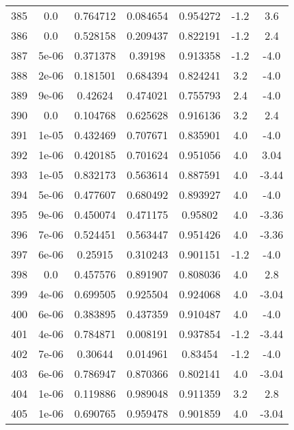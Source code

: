 \begin{table}
\begin{tabular}{c|c|c|c|c|c|c}
385 & 0.0 & 0.764712 & 0.084654 & 0.954272 & -1.2 & 3.6\\
386 & 0.0 & 0.528158 & 0.209437 & 0.822191 & -1.2 & 2.4\\
387 & 5e-06 & 0.371378 & 0.39198 & 0.913358 & -1.2 & -4.0\\
388 & 2e-06 & 0.181501 & 0.684394 & 0.824241 & 3.2 & -4.0\\
389 & 9e-06 & 0.42624 & 0.474021 & 0.755793 & 2.4 & -4.0\\
390 & 0.0 & 0.104768 & 0.625628 & 0.916136 & 3.2 & 2.4\\
391 & 1e-05 & 0.432469 & 0.707671 & 0.835901 & 4.0 & -4.0\\
392 & 1e-06 & 0.420185 & 0.701624 & 0.951056 & 4.0 & 3.04\\
393 & 1e-05 & 0.832173 & 0.563614 & 0.887591 & 4.0 & -3.44\\
394 & 5e-06 & 0.477607 & 0.680492 & 0.893927 & 4.0 & -4.0\\
395 & 9e-06 & 0.450074 & 0.471175 & 0.95802 & 4.0 & -3.36\\
396 & 7e-06 & 0.524451 & 0.563447 & 0.951426 & 4.0 & -3.36\\
397 & 6e-06 & 0.25915 & 0.310243 & 0.901151 & -1.2 & -4.0\\
398 & 0.0 & 0.457576 & 0.891907 & 0.808036 & 4.0 & 2.8\\
399 & 4e-06 & 0.699505 & 0.925504 & 0.924068 & 4.0 & -3.04\\
400 & 6e-06 & 0.383895 & 0.437359 & 0.910487 & 4.0 & -4.0\\
401 & 4e-06 & 0.784871 & 0.008191 & 0.937854 & -1.2 & -3.44\\
402 & 7e-06 & 0.30644 & 0.014961 & 0.83454 & -1.2 & -4.0\\
403 & 6e-06 & 0.786947 & 0.870366 & 0.802141 & 4.0 & -3.04\\
404 & 1e-06 & 0.119886 & 0.989048 & 0.911359 & 3.2 & 2.8\\
405 & 1e-06 & 0.690765 & 0.959478 & 0.901859 & 4.0 & -3.04\\
\end{tabular}
\end{table}
\newpage
